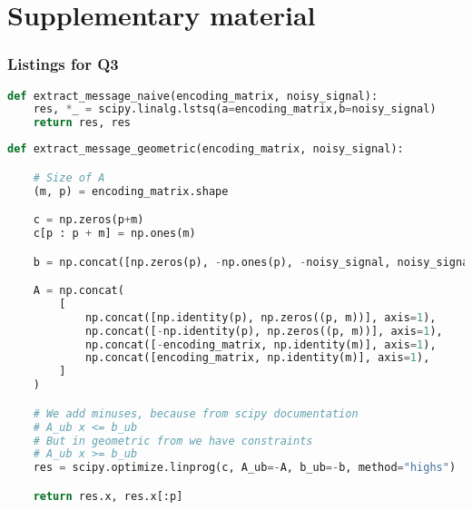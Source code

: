 \documentclass{article}
\begin{document}
\clearpage
\appendix

\part*{Supplementary material}
\section{Listings for Q3}

\begin{lstlisting}[language=Python, caption={Naive message decryption. The output is tuple of solution of the problem, and decrypted message itself}, label={lst:naive}]
  def extract_message_naive(encoding_matrix, noisy_signal):
    res, *_ = scipy.linalg.lstsq(a=encoding_matrix,b=noisy_signal)
    return res, res
\end{lstlisting}



\begin{lstlisting}[language=Python, caption={Message decryption based on solution of LOP in geometric form. The output is tuple of solution of the problem, and decrypted message itself}, label={lst:geom}]
  def extract_message_geometric(encoding_matrix, noisy_signal):

    # Size of A
    (m, p) = encoding_matrix.shape

    c = np.zeros(p+m)
    c[p : p + m] = np.ones(m)

    b = np.concat([np.zeros(p), -np.ones(p), -noisy_signal, noisy_signal])

    A = np.concat(
        [
            np.concat([np.identity(p), np.zeros((p, m))], axis=1),
            np.concat([-np.identity(p), np.zeros((p, m))], axis=1),
            np.concat([-encoding_matrix, np.identity(m)], axis=1),
            np.concat([encoding_matrix, np.identity(m)], axis=1),
        ]
    )

    # We add minuses, because from scipy documentation
    # A_ub x <= b_ub
    # But in geometric from we have constraints
    # A_ub x >= b_ub
    res = scipy.optimize.linprog(c, A_ub=-A, b_ub=-b, method="highs")

    return res.x, res.x[:p]
\end{lstlisting}

\pagebreak
\end{document}

